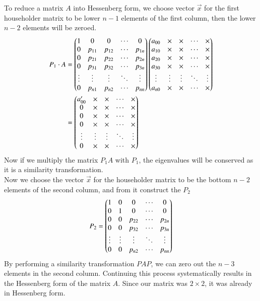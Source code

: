 \documentclass[journal]{IEEEtran}
\begin{document}
To reduce a matrix $A$ into Hessenberg form, we choose vector $\vec{x}$ for the first householder matrix to be lower $n-1$ elements of the first column, then the lower $n-2$ elements will be zeroed.
\begin{align}
P_1\cdot A &= \begin{pmatrix}
1 & 0 & 0 & \cdots & 0 \\
0 & p_{11} & p_{12} & \cdots & p_{1n} \\
0      & p_{21} & p_{22} & \cdots & p_{2n} \\
0      & p_{31} & p_{32} & \cdots & p_{3n} \\
\vdots & \vdots & \vdots & \ddots & \vdots \\
0      & p_{n1} & p_{n2} & \cdots & p_{nn}
\end{pmatrix}\begin{pmatrix}
a_{00} & \times & \times & \cdots & \times \\
a_{10} & \times & \times & \cdots & \times \\
a_{20} & \times & \times & \cdots & \times \\
a_{30} & \times & \times & \cdots & \times \\
\vdots & \vdots & \vdots & \ddots & \vdots \\
a_{n0} & \times & \times & \cdots & \times
\end{pmatrix}\\
&=\begin{pmatrix}
a_{00}^\prime & \times & \times & \cdots & \times \\
0 & \times & \times & \cdots & \times \\
0      & \times & \times & \cdots & \times \\
0      & \times   & \times & \cdots & \times \\
\vdots & \vdots & \vdots & \ddots & \vdots \\
0      & \times      & \times      & \cdots & \times
\end{pmatrix}
\end{align}
Now if we multiply the matrix $P_1A$ with $P_1$, the eigenvalues will be conserved as it is a similarity transformation.\\
Now we choose the vector $\vec{x}$ for the householder matrix to be the bottom $n-2$ elements of the second column, and from it construct the $P_2$
\begin{align}
P_2 = \begin{pmatrix}
1 & 0 & 0 & \cdots & 0 \\
0 & 1 & 0 & \cdots & 0 \\
0 & 0 & p_{22} & \cdots & p_{2n} \\
0 & 0 & p_{32} & \cdots & p_{3n} \\
\vdots & \vdots & \vdots & \ddots & \vdots \\
0 & 0 & p_{n2} & \cdots & p_{nn}
\end{pmatrix}
\end{align}
By performing a similarity transformation $PAP$, we can zero out the $n-3$ elements in the second column. Continuing this process systematically results in the Hessenberg form of the matrix $A$. Since our matrix was $2 \times 2$, it was already in Hessenberg form. 
\end{document}
